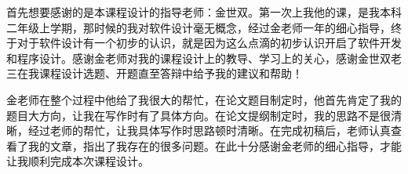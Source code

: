 
\acknowledgement
{}

首先想要感谢的是本课程设计的指导老师：金世双。第一次上我他的课，是我本科二年级上学期，那时候的我对软件设计毫无概念，经过金老师一年的细心指导，终于对于软件设计有一个初步的认识，就是因为这么点滴的初步认识开启了软件开发和程序设计。感谢金老师对我的课程设计上的教导、学习上的关心，感谢金世双老三在我课程设计选题、开题直至答辩中给予我的建议和帮助！

金老师在整个过程中他给了我很大的帮忙，在论文题目制定时，他首先肯定了我的题目大方向，让我在写作时有了具体方向。在论文提纲制定时，我的思路不是很清晰，经过老师的帮忙，让我具体写作时思路顿时清晰。在完成初稿后，老师认真查看了我的文章，指出了我存在的很多问题。在此十分感谢金老师的细心指导，才能让我顺利完成本次课程设计。









